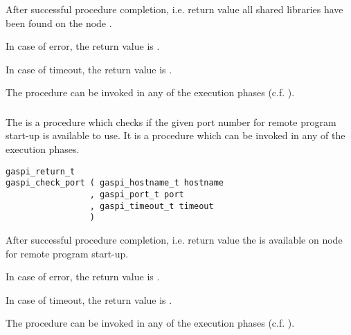 After successful procedure completion, i.e. return value \GASPISUCC{}
all shared libraries have been found on the node . 

In case of error, the return value is \GASPIGERR{}. 

In case of timeout, the return value is \GASPITIME{}.

The procedure can be invoked in any of the \GASPI{} execution phases (c.f.  ).

\subsubsection{}

The  is a  
 
procedure which checks if the given port number for remote program
start-up is available to use. It is a procedure
which can be invoked in any of the \GASPI{} execution phases.

\begin{FDef}
\begin{FDefSign}
\begin{verbatim}
gaspi_return_t
gaspi_check_port ( gaspi_hostname_t hostname
                 , gaspi_port_t port
                 , gaspi_timeout_t timeout
                 )
\end{verbatim}
\end{FDefSign}
\parameterlistbegin
{}
\parameterlistend
\FStdRetDesc
\end{FDef}

After successful procedure completion, i.e. return value \GASPISUCC{}
the  is available on node  for
remote program start-up.

In case of error, the return value is \GASPIGERR{}. 

In case of timeout, the return value is \GASPITIME{}.

The procedure can be invoked in any of the \GASPI{} execution phases (c.f.  ).

\subsubsection{}

